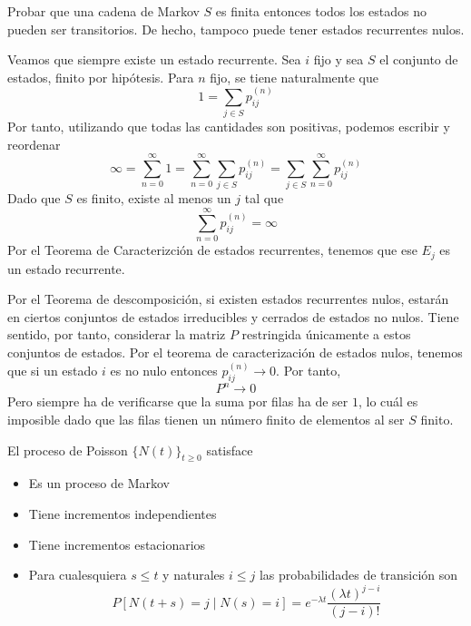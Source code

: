 \documentclass[twoside]{article}
\begin{document}
\begin{ejercicio}{9}
Probar que una cadena de Markov $S$ es finita entonces todos los estados no pueden ser transitorios. De hecho, tampoco puede tener estados recurrentes nulos.
\end{ejercicio}
\begin{solucion}
Veamos que siempre existe un estado recurrente. Sea $i$ fijo y sea $S$ el conjunto de estados, finito por hipótesis. Para $n$ fijo, se tiene naturalmente que
$$
1 = \sum_{j \in S} p_{ij}^{(n)}
$$
Por tanto, utilizando que todas las cantidades son positivas, podemos escribir y reordenar
$$
\infty = \sum_{n =0}^{\infty} 1 = \sum_{n =0}^{\infty}\sum_{j \in S} p_{ij}^{(n)} = \sum_{j \in S} \sum_{n =0}^{\infty} p_{ij}^{(n)}	
$$
Dado que $S$ es finito, existe al menos un $j$ tal que
$$
 \sum_{n =0}^{\infty} p_{ij}^{(n)}	 = \infty
$$
Por el Teorema de Caracterizción de estados recurrentes, tenemos que ese $E_j$ es un estado recurrente.

Por el Teorema de descomposición, si existen estados recurrentes nulos, estarán en ciertos conjuntos de estados irreducibles y cerrados de estados no nulos. Tiene sentido, por tanto, considerar la matriz $P$ restringida únicamente a estos conjuntos de estados. Por el teorema de caracterización de estados nulos, tenemos que si un estado $i$ es no nulo entonces $p_{ij}^{(n)}\to 0$. Por tanto,
$$
P^n \to 0
$$
Pero siempre ha de verificarse que la suma por filas ha de ser $1$, lo cuál es imposible dado que las filas tienen un número finito de elementos al ser $S$ finito.
\end{solucion}
\newpage
\begin{ejercicio}{10}
El proceso de Poisson $\{N(t)\}_{t\geq 0}$ satisface
\begin{itemize}
\item Es un proceso de Markov
\item Tiene incrementos independientes
\item Tiene incrementos estacionarios
\item Para cualesquiera $s\leq t$ y naturales $i\leq j$ las probabilidades de transición son
$$
P[N(t+s)=j\mid N(s)=i] = e^{-\lambda t}\frac{(\lambda t)^{j-i}}{(j-i)!}
$$
\end{itemize}
\end{ejercicio}
\end{document}
